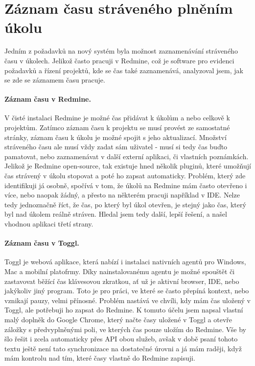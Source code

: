 
\section{Záznam času stráveného plněním úkolu}\label{implementation:time_tracking}

Jedním z požadavků na nový systém byla možnost zaznamenávání stráveného času v úkolech. Jelikož často pracuji v Redmine, což je software pro evidenci požadavků a řízení projektů, kde se čas také zaznamenává, analyzoval jsem, jak se zde se záznamem času pracuje.

\paragraph{Záznam času v Redmine.} V čisté instalaci Redmine je možné čas přidávat k úkolům a nebo celkově k projektům. Zatímco záznam času k projektu se musí provést ze samostatné stránky, záznam času k úkolu je možné spojit s jeho aktualizací. Množství stráveného času ale musí vždy zadat sám uživatel - musí si tedy čas buďto pamatovat, nebo zaznamenávat v další externí aplikaci, či vlastních poznámkách. Jelikož je Redmine open-source, tak existuje hned několik pluginů, které umožňují čas strávený v úkolu stopovat a poté ho zapsat automaticky. Problém, který zde identifikuji já osobně, spočívá v tom, že úkolů na Redmine mám často otevřeno i více, nebo naopak žádný, a přesto na některém pracuji například v IDE. Nelze tedy jednoznačně říct, že čas, po který byl úkol otevřen, je stejný jako čas, který byl nad úkolem reálně stráven. Hledal jsem tedy další, lepší řešení, a našel vhodnou aplikaci třetí strany.

\paragraph{Záznam času v Toggl.} Toggl je webová aplikace, která nabízí i instalaci nativních agentů pro Windows, Mac a mobilní platofrmy. Díky nainstalovanému agentu je možné spouštět či zastavovat běžící čas klávesovou zkratkou, ať už je aktivní browser, IDE, nebo jakýkoliv jiný program. Toto je pro práci, ve které se často přepíná kontext, nebo vznikají pauzy, velmi přínosné. Problém nastává ve chvíli, kdy mám čas uložený v Toggl, ale potřebuji ho zapsat do Redmine. K tomuto účelu jsem napsal vlastní malý doplněk do Google Chrome, který načte časy uložené v Toggl a otevře záložky s předvyplněnými poli, ve kterých čas pouze uložím do Redmine. Vše by šlo řešit i zcela automaticky přes API obou služeb, avšak v době psaní tohoto textu ještě není tato synchronizace na dostatečné úrovni a já mám raději, když mám kontrolu nad tím, které časy vlastně do Redmine zapisuji.

